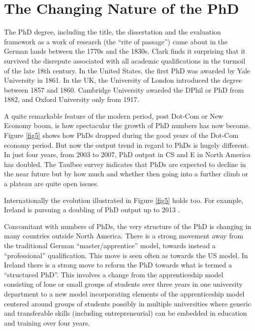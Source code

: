 \documentclass{article}
\begin{document}
\section{The Changing Nature of the PhD}
\label{phd}

The PhD degree, including the title, the dissertation and the
evaluation framework 
as a work of research (the ``rite of passage'') 
came about in the German lands between the 1770s and the 1830s.  Clark 
\cite{clark} finds it surprising that it survived the disrepute
associated with all
academic qualifications in the turmoil of the late 18th century.  In the 
United States, the first PhD was awarded by Yale University in 1861.  In the 
UK, the University of London introduced the degree between 1857 and 1860.  
Cambridge University awarded the DPhil or PhD from 1882, and Oxford 
University only from 1917.  

A quite remarkable feature of the modern period, post Dot-Com 
or New Economy boom,
 is how spectacular the growth of PhD numbers has now become.  
Figure \ref{fig5} shows how PhDs dropped during the good years of the Dot-Com 
economy period.  But now the output trend in regard to PhDs 
is hugely different.  
In just four years, from 2003 to 2007, PhD output in CS and E 
in North America has 
doubled.   The Taulbee survey indicates that PhDs are expected to decline 
in the near future 
but by how much and whether then going into a further climb or a 
plateau are quite open issues.  

Internationally the evolution illustrated in Figure \ref{fig5} 
holds too.  For example, Ireland is pursuing a doubling of PhD output up 
to 2013 \cite{ssti}.  

Concomitant with numbers of PhDs, the very 
structure of the PhD is changing in many countries outside North 
America.  There is a strong movement away from the traditional
German ``master/apprentice'' model, towards instead a ``professional''
qualification.  This move is seen often as towards the US model.    
In Ireland there is a strong move to reform the PhD towards what is 
termed a 
``structured PhD''.  This involves a change from the apprenticeship model 
consisting 
of lone or small groups of students over three years in one university 
department to a 
new model incorporating elements of the apprenticeship model centered around 
groups of students possibly in multiple universities where generic and 
transferable 
skills (including entrepreneurial) can be embedded in education and 
training over four 
years.  
\end{document}
